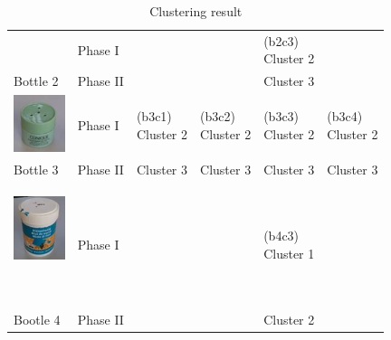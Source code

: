 \begin{table}
\begin{tabular}{p{1.4cm} p{1.4cm}|p{1.6cm} p{1.6cm} p{1.6cm}  p{1.6cm} }
         & Phase I  &           &           &{\vspace{-0.7cm}}\pbox{2cm}{(b2c3) \\Cluster 2} &           \\
Bottle 2 & Phase II &           &           &       Cluster 3 &           \\ \hline
{\parbox[c]{1em}{\includegraphics[width=1.5cm]{./fig/b3.jpg}} }
         & Phase I  &{\vspace{-0.7cm}}\pbox{2cm}{(b3c1) \\Cluster 2} &{\vspace{-0.7cm}}\pbox{2cm}{(b3c2) \\Cluster 2} &{\vspace{-0.7cm}}\pbox{2cm}{(b3c3) \\Cluster 2} &{\vspace{-0.7cm}}\pbox{2cm}{(b3c4) \\Cluster 2} \\
Bottle 3 & Phase II &       Cluster 3 &       Cluster 3 &       Cluster 3 &       Cluster 3 \\ \hline
{\parbox[c]{1em}{\includegraphics[width=1.5cm]{./fig/b4.jpg}}\newline }
         & Phase I  &           &           &{\vspace{-0.7cm}}\pbox{2cm}{(b4c3) \\Cluster 1} &           \\
Bootle 4 & Phase II &           &           &       Cluster 2 &           \\ \hline
\end{tabular}
\caption{Clustering result}
\label{tab:cluster}
\end{table}


